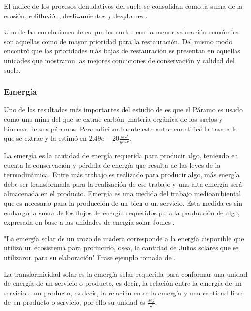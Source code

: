 \documentclass[11pt]{article}
\begin{document}
El índice de los procesos denudativos del suelo se consolidan como la suma de la erosión, solifluxión, deslizamientos y desplomes \citep{Castro-Romero2014}. %



Una de las conclusiones de \citep{Castro-Romero2014} es que los suelos con la menor valoración económica son aquellas como de mayor prioridad para la restauración. Del mismo modo \citep{Castro-Romero2014} encontró que las prioridades más bajas de restauración se presentan en aquellas unidades que mostraron las mejores condiciones de conservación y calidad del suelo.

\subsubsection{Emergía}

Uno de los resultados más importantes del estudio de \citep{Ernesto} es que el Páramo es usado como una mina del que se extrae carbón, materia orgánica de los suelos y biomasa de sus páramos. Pero adicionalmente este autor cuantificó la tasa a la que se extrae y la estimó en $2.49e-20 \frac{seJ}{year}$.

La emergía es la cantidad de energía requerida para producir algo, teniendo en cuenta la conservación y pérdida de energía que resulta de las leyes de la termodinámica. Entre más trabajo es realizado para producir algo, más energía debe ser transformada para la realización de ese trabajo y una alta emergía será almacenada en el producto. Emergía es una medida del trabajo medioambiental que es necesario para la producción de un bien o un servicio. Esta medida es sin embargo la suma de los flujos de energía requeridos para la producción de algo, expresada en base a las unidades de energía solar Joules \citep{lei2014ecological}.

"La emergía solar de un trozo de madera corresponde a la energía disponible que utilizó un ecosistema para producirlo, osea, la cantidad de Julios solares que se utilizaron para su elaboración" Frase ejemplo tomada de \citep{Castro-Romero2014}.

La transformicidad solar es la emergía solar requerida para conformar una unidad de energía de un servicio o producto, es decir, la relación entre la emergía de un servicio o un producto, es decir, la relación entre la emergía y una cantidad libre de un producto o servicio, por ello su unidad es $\frac{sej}{J}$.
\end{document}
